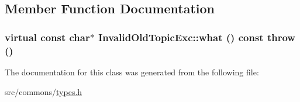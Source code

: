 \subsection{Member Function Documentation}
\hypertarget{class_invalid_old_topic_exc_a5a01f4d3e6e8deb0076d6c116f0bec24}{
\subsubsection[{what}]{\setlength{\rightskip}{0pt plus 5cm}virtual const char$\ast$ InvalidOldTopicExc::what () const  throw ()}}
\label{class_invalid_old_topic_exc_a5a01f4d3e6e8deb0076d6c116f0bec24}


The documentation for this class was generated from the following file:\begin{DoxyCompactItemize}
\item 
src/commons/\hyperlink{types_8h}{types.h}\end{DoxyCompactItemize}
